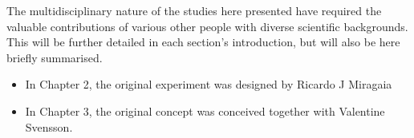 
\begin{contributions}

The multidisciplinary nature of the studies here presented have required the valuable contributions of various other people with diverse scientific backgrounds. This will be further detailed in each section's introduction, but will also be here briefly summarised.

\begin{itemize}
\item In Chapter 2, the original experiment was designed by Ricardo J Miragaia 
\item In Chapter 3, the original concept was conceived together with Valentine Svensson.
\end{itemize}


\end{contributions}